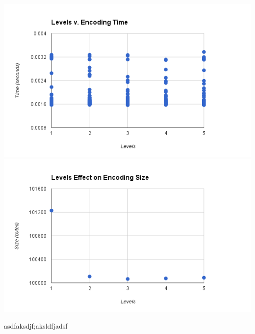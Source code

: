 \documentclass{article}
\begin{document}
\includegraphics[scale=0.4]{images/betterlevel_v_encode}
\includegraphics[scale=0.4]{images/lvl_encodingsize}
\afterpage{\vfill}

asdfaksdjf;aksldfjadsf\\
\end{document}
